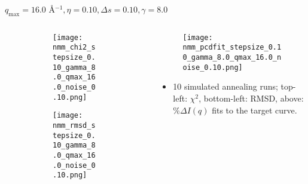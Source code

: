 \documentclass{beamer}
\begin{document}
\begin{frame}{$ q_{\textrm{max}}=16.0 $ \AA $^{-1}, \eta=0.10, \Delta s=0.10, \gamma=8.0$}
	\begin{columns}
		\begin{column}{.5\textwidth}
			\begin{figure}[H]
			\centering
			\begin{subfigure}[b]{\textwidth}
				\centering
				\texttt{[image: nmm\_chi2\_stepsize\_0.10\_gamma\_8.0\_qmax\_16.0\_noise\_0.10.png]}
				\label{fig:}
			\end{subfigure}
			\begin{subfigure}[b]{\textwidth}
				\centering
				\texttt{[image: nmm\_rmsd\_stepsize\_0.10\_gamma\_8.0\_qmax\_16.0\_noise\_0.10.png]}
				\label{fig:}
			\end{subfigure}
			\end{figure}
		\end{column}
		\begin{column}{.5\textwidth}
			\begin{figure}[H]
				\centering
				\texttt{[image: nmm\_pcdfit\_stepsize\_0.10\_gamma\_8.0\_qmax\_16.0\_noise\_0.10.png]}
				\label{fig:}
			\end{figure}
			\begin{itemize}
				\item 10 simulated annealing runs; top-left: $\chi^2$, bottom-left: RMSD, above: $\%\Delta I(q)$ fits to the target curve.
			\end{itemize}
		\end{column}
	\end{columns}
\end{frame}
 
\end{document}
